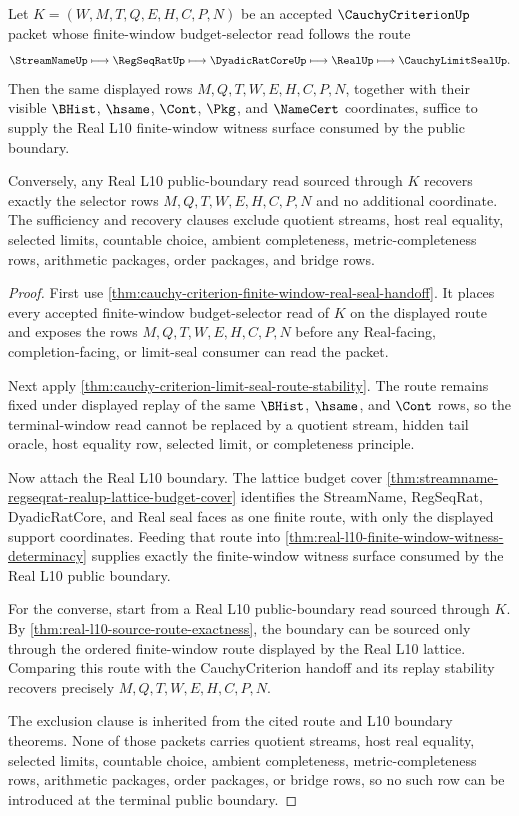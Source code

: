 \begin{theorem}
\label{thm:cauchycriterion-real-l10-terminal-window-sufficiency}
Let $K=(W,M,T,Q,E,H,C,P,N)$ be an accepted $\CauchyCriterionUp$ packet whose
finite-window budget-selector read follows the route
$$
\StreamNameUp
\longmapsto \RegSeqRatUp
\longmapsto \DyadicRatCoreUp
\longmapsto \RealUp
\longmapsto \CauchyLimitSealUp .
$$
Then the same displayed rows $M,Q,T,W,E,H,C,P,N$, together with their visible
$\BHist$, $\hsame$, $\Cont$, $\Pkg$, and $\NameCert$ coordinates, suffice to
supply the Real L10 finite-window witness surface consumed by the public
boundary.

Conversely, any Real L10 public-boundary read sourced through $K$ recovers
exactly the selector rows $M,Q,T,W,E,H,C,P,N$ and no additional coordinate. The
sufficiency and recovery clauses exclude quotient streams, host real equality,
selected limits, countable choice, ambient completeness, metric-completeness
rows, arithmetic packages, order packages, and bridge rows.
\end{theorem}
\begin{proof}
First use \autoref{thm:cauchy-criterion-finite-window-real-seal-handoff}. It
places every accepted finite-window budget-selector read of $K$ on the
displayed route and exposes the rows $M,Q,T,W,E,H,C,P,N$ before any Real-facing,
completion-facing, or limit-seal consumer can read the packet.

Next apply \autoref{thm:cauchy-criterion-limit-seal-route-stability}. The
route remains fixed under displayed replay of the same $\BHist$, $\hsame$, and
$\Cont$ rows, so the terminal-window read cannot be replaced by a quotient
stream, hidden tail oracle, host equality row, selected limit, or completeness
principle.

Now attach the Real L10 boundary. The lattice budget cover
\autoref{thm:streamname-regseqrat-realup-lattice-budget-cover} identifies the
StreamName, RegSeqRat, DyadicRatCore, and Real seal faces as one finite route,
with only the displayed support coordinates. Feeding that route into
\autoref{thm:real-l10-finite-window-witness-determinacy} supplies exactly the
finite-window witness surface consumed by the Real L10 public boundary.

For the converse, start from a Real L10 public-boundary read sourced through
$K$. By \autoref{thm:real-l10-source-route-exactness}, the boundary can be
sourced only through the ordered finite-window route displayed by the Real L10
lattice. Comparing this route with the CauchyCriterion handoff and its replay
stability recovers precisely $M,Q,T,W,E,H,C,P,N$.

The exclusion clause is inherited from the cited route and L10 boundary
theorems. None of those packets carries quotient streams, host real equality,
selected limits, countable choice, ambient completeness, metric-completeness
rows, arithmetic packages, order packages, or bridge rows, so no such row can be
introduced at the terminal public boundary.
\end{proof}

